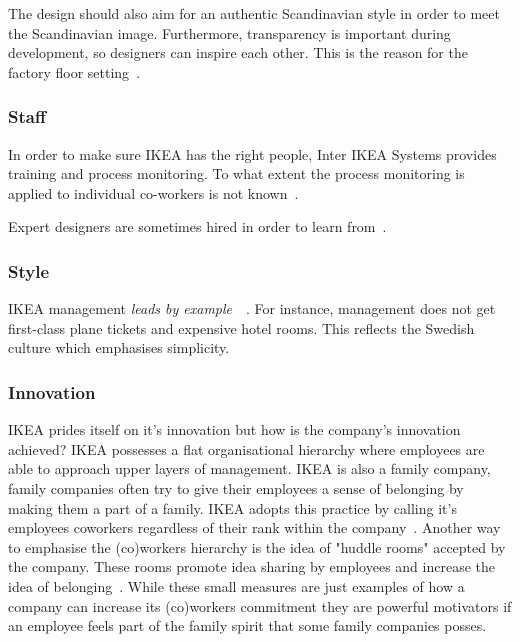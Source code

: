 The design should also aim for an authentic Scandinavian style in order to meet the Scandinavian image.
Furthermore, transparency is important during development, so designers can inspire each other.
This is the reason for the factory floor setting~\citep{dezeen2015}.

\subsubsection{Staff}
In order to make sure IKEA has the right people, Inter IKEA Systems provides training and process monitoring.
To what extent the process monitoring is applied to individual co-workers is not known~\citep{franchisorikea}.

Expert designers are sometimes hired in order to learn from~\citep{dezeen2015}.

\subsubsection{Style}
IKEA management \emph{leads by example}~\citep{ikea2016}~\citep{al-hammadi}.
For instance, management does not get first-class plane tickets and expensive hotel rooms.
This reflects the Swedish culture which emphasises simplicity.

\subsubsection{Innovation}

IKEA prides itself on it's innovation but how is the company's innovation achieved? IKEA possesses a flat organisational hierarchy where employees are able to approach upper layers of management. IKEA is also a family company, family companies often try to give their employees a sense of belonging by making them a part of a family. IKEA adopts this practice by calling it's employees coworkers regardless of their rank within the company~\citep{prasant2014}.
Another way to emphasise the (co)workers hierarchy is the idea of "huddle rooms" accepted by the company. These rooms promote idea sharing by employees and increase the idea of belonging~\citep{prasant2014}. While these small measures are just examples of how a company can increase its (co)workers commitment they are powerful motivators if an employee feels part of the family spirit that some family companies posses. 
